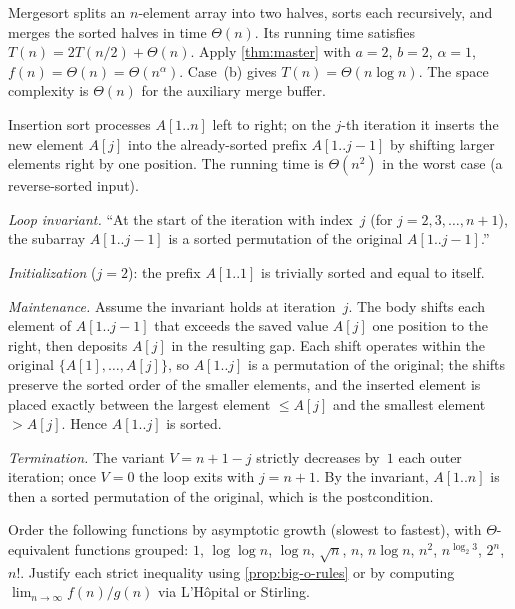 \begin{example}
\label{ex:mergesort}
Mergesort splits an $n$-element array into two halves, sorts each
recursively, and merges the sorted halves in time $\Theta(n)$. Its
running time satisfies $T(n) = 2 T(n/2) + \Theta(n)$. Apply
\cref{thm:master} with $a = 2$, $b = 2$, $\alpha = 1$,
$f(n) = \Theta(n) = \Theta(n^\alpha)$. Case~(b) gives
$T(n) = \Theta(n \log n)$. The space complexity is $\Theta(n)$ for
the auxiliary merge buffer.
\end{example}

\begin{example}
\label{ex:insertion-sort}
Insertion sort processes $A[1..n]$ left to right; on the $j$-th
iteration it inserts the new element $A[j]$ into the already-sorted
prefix $A[1..j-1]$ by shifting larger elements right by one position.
The running time is $\Theta(n^2)$ in the worst case (a reverse-sorted
input).

\emph{Loop invariant.} ``At the start of the iteration with index~$j$
(for $j = 2, 3, \dots, n + 1$), the subarray $A[1..j-1]$ is a sorted
permutation of the original $A[1..j-1]$.''

\emph{Initialization} ($j = 2$): the prefix $A[1..1]$ is trivially
sorted and equal to itself.

\emph{Maintenance.} Assume the invariant holds at iteration~$j$. The
body shifts each element of $A[1..j-1]$ that exceeds the saved value
$A[j]$ one position to the right, then deposits $A[j]$ in the
resulting gap. Each shift operates within the original
$\{A[1], \dots, A[j]\}$, so $A[1..j]$ is a permutation of the original;
the shifts preserve the sorted order of the smaller elements, and
the inserted element is placed exactly between the largest element
$\leq A[j]$ and the smallest element $> A[j]$. Hence $A[1..j]$ is
sorted.

\emph{Termination.} The variant $V = n + 1 - j$ strictly decreases
by~$1$ each outer iteration; once $V = 0$ the loop exits with
$j = n + 1$. By the invariant, $A[1..n]$ is then a sorted
permutation of the original, which is the postcondition.
\end{example}

\begin{problem}
\label{prob:growth-hierarchy}
Order the following functions by asymptotic growth (slowest to
fastest), with $\Theta$-equivalent functions grouped:
$1$, $\log\log n$, $\log n$, $\sqrt{n}$, $n$, $n \log n$, $n^2$,
$n^{\log_2 3}$, $2^n$, $n!$. Justify each strict inequality using
\cref{prop:big-o-rules} or by computing
$\lim_{n \to \infty} f(n)/g(n)$ via L'Hôpital or Stirling.
\end{problem}

